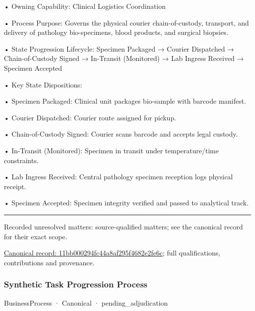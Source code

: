 •
Owning Capability: Clinical Logistics Coordination



•
Process Purpose: Governs the physical courier chain-of-custody, transport, and delivery of pathology bio-specimens, blood products, and surgical biopsies.



•
State Progression Lifecycle: Specimen Packaged → Courier Dispatched → Chain-of-Custody Signed → In-Transit (Monitored) → Lab Ingress Received → Specimen Accepted



•
Key State Dispositions:



•
Specimen Packaged: Clinical unit packages bio-sample with barcode manifest.



•
Courier Dispatched: Courier route assigned for pickup.



•
Chain-of-Custody Signed: Courier scans barcode and accepts legal custody.



•
In-Transit (Monitored): Specimen in transit under temperature/time constraints.



•
Lab Ingress Received: Central pathology specimen reception logs physical receipt.



•
Specimen Accepted: Specimen integrity verified and passed to analytical track.



\medskip\hrule\medskip

{\small Recorded unresolved matters: source-qualified matters; see the canonical record for their exact scope.}\par
{\footnotesize \href{../../../../continuum/business/business-process/11bb000294fc44a8af295f4682e2fe6c.md}{Canonical record: 11bb000294fc44a8af295f4682e2fe6c}; full qualifications, contributions and provenance.}\par
\subsubsection{Synthetic Task Progression Process}

\label{element:618acdb38fc74952ab360fdde4f7d865}
{\small BusinessProcess · Canonical · pending\_adjudication}\par

